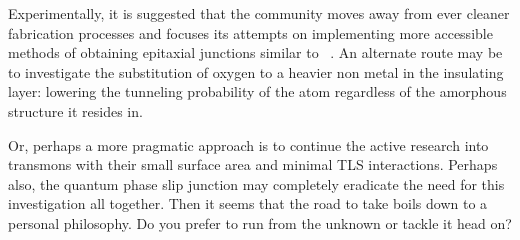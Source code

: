 Experimentally, it is suggested that the community moves away from ever cleaner fabrication processes and focuses its attempts on implementing more accessible methods of obtaining epitaxial junctions similar to \citeauthor{Oh2006}~\cite{Oh2006}.
An alternate route may be to investigate the substitution of oxygen to a heavier non metal in the insulating layer: lowering the tunneling probability of the atom regardless of the amorphous structure it resides in.

Or, perhaps a more pragmatic approach is to continue the active research into transmons with their small surface area and minimal TLS interactions.
Perhaps also, the quantum phase slip junction may completely eradicate the need for this investigation all together.
Then it seems that the road to take boils down to a personal philosophy.
Do you prefer to run from the unknown or tackle it head on?
\begin{center}
\resizebox{!}{1cm}{}
\end{center}
